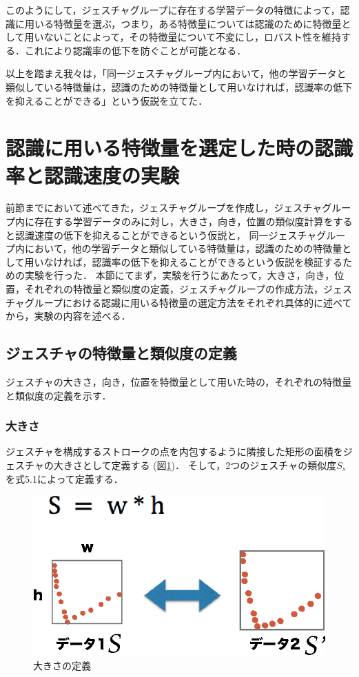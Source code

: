 このようにして，ジェスチャグループに存在する学習データの特徴によって，認識に用いる特徴量を選ぶ，つまり，ある特徴量については認識のために特徴量として用いないことによって，その特徴量について不変にし，ロバスト性を維持する．これにより認識率の低下を防ぐことが可能となる．

以上を踏まえ我々は，「同一ジェスチャグループ内において，他の学習データと類似している特徴量は，認識のための特徴量として用いなければ，認識率の低下を抑えることができる」という仮説を立てた．

\section{認識に用いる特徴量を選定した時の認識率と認識速度の実験}
前節までにおいて述べてきた，ジェスチャグループを作成し，ジェスチャグループ内に存在する学習データのみに対し，大きさ，向き，位置の類似度計算をすると認識速度の低下を抑えることができるという仮説と，
同一ジェスチャグループ内において，他の学習データと類似している特徴量は，認識のための特徴量として用いなければ，認識率の低下を抑えることができるという仮説を検証するための実験を行った．
本節にてまず，実験を行うにあたって，大きさ，向き，位置，それぞれの特徴量と類似度の定義，ジェスチャグループの作成方法，ジェスチャグループにおける認識に用いる特徴量の選定方法をそれぞれ具体的に述べてから，実験の内容を述べる．

\subsection{ジェスチャの特徴量と類似度の定義}
ジェスチャの大きさ，向き，位置を特徴量として用いた時の，それぞれの特徴量と類似度の定義を示す．

\subsubsection{大きさ}
ジェスチャを構成するストロークの点を内包するように隣接した矩形の面積をジェスチャの大きさとして定義する (図\ref{fig:v_size})．
そして，2つのジェスチャの類似度$S_\textit{s}$を式5.1によって定義する．

\begin{figure} [h!]
	\begin{center}
		\includegraphics [width=0.45\hsize ]{img/v_size.eps}
	\end{center}
	\caption{大きさの定義}
	\label{fig:v_size}
\end{figure}

